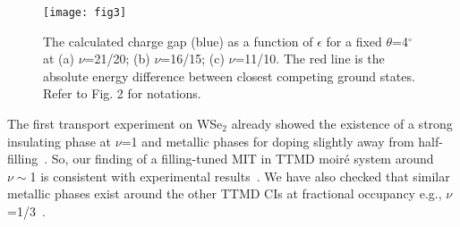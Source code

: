 \documentclass[aps,prl,floatfix,twocolumn]{revtex4-2}
\begin{document}
\begin{figure}[t]
	\centering
	\texttt{[image: fig3]}
	\caption{The calculated charge gap {(blue)} as a function of $ \epsilon $ for a fixed $ \theta$=4$^\circ $ at (a) $ \nu $=21/20; (b) $ \nu $=16/15; (c) $ \nu $=11/10. {The red line} is the absolute energy difference between closest competing ground states. Refer to Fig. 2 for notations.}
	\label{fig:fig3}
\end{figure}



{The first transport experiment on WSe${}_2$ already showed the existence of a strong insulating phase at $\nu$=1 and metallic phases for doping slightly away from half-filling~\cite{wang2020correlated}. So, our finding of a filling-tuned MIT in TTMD moir\'e system around $ \nu\sim $1 is consistent with experimental results~\cite{ghiotto2021quantum}.
We have also checked that similar metallic phases exist around the other TTMD {CIs} at fractional occupancy {e.g., $ \nu $=1/3}~\cite{MI_SM}.}
\end{document}
